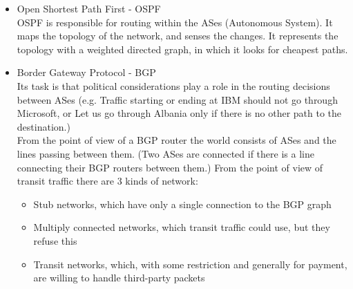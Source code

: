 \documentclass[margin=0px]{article}
\begin{document}
\begin{description}
\begin{itemize}
            \item Open Shortest Path First - OSPF \\
                  OSPF is responsible for routing within the ASes (Autonomous System). It maps the topology of the network, and senses the changes. It represents the topology with a weighted directed graph, in which it looks for cheapest paths.
            \item Border Gateway Protocol - BGP \\
                  Its task is that political considerations play a role in the routing decisions between ASes (e.g. Traffic starting or ending at IBM should not go through Microsoft, or Let us go through Albania only if there is no other path to the destination.)\\
                  From the point of view of a BGP router the world consists of ASes and the lines passing between them. (Two ASes are connected if there is a line connecting their BGP routers between them.)
                  From the point of view of transit traffic there are 3 kinds of network:
                  \begin{itemize}
                      \item Stub networks, which have only a single connection to the BGP graph
                      \item Multiply connected networks, which transit traffic could use, but they refuse this
                      \item Transit networks, which, with some restriction and generally for payment, are willing to handle third-party packets
                  \end{itemize}
        \end{itemize}
\end{description}
\end{document}
